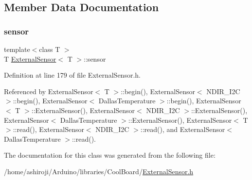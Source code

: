 \subsection{Member Data Documentation}
\mbox{\label{classExternalSensor_a6e1f518119abe08c14b498ce24a7e1b3}} 
\subsubsection{\texorpdfstring{sensor}{sensor}}
{\footnotesize\ttfamily template$<$class T $>$ \\
T \hyperlink{classExternalSensor}{External\+Sensor}$<$ T $>$\+::sensor\hspace{0.3cm}{\ttfamily [private]}}



Definition at line 179 of file External\+Sensor.\+h.



Referenced by External\+Sensor$<$ T $>$\+::begin(), External\+Sensor$<$ N\+D\+I\+R\+\_\+\+I2\+C $>$\+::begin(), External\+Sensor$<$ Dallas\+Temperature $>$\+::begin(), External\+Sensor$<$ T $>$\+::\+External\+Sensor(), External\+Sensor$<$ N\+D\+I\+R\+\_\+\+I2\+C $>$\+::\+External\+Sensor(), External\+Sensor$<$ Dallas\+Temperature $>$\+::\+External\+Sensor(), External\+Sensor$<$ T $>$\+::read(), External\+Sensor$<$ N\+D\+I\+R\+\_\+\+I2\+C $>$\+::read(), and External\+Sensor$<$ Dallas\+Temperature $>$\+::read().



The documentation for this class was generated from the following file\+:\begin{DoxyCompactItemize}
\item 
/home/ashiroji/\+Arduino/libraries/\+Cool\+Board/\hyperlink{ExternalSensor_8h}{External\+Sensor.\+h}\end{DoxyCompactItemize}
